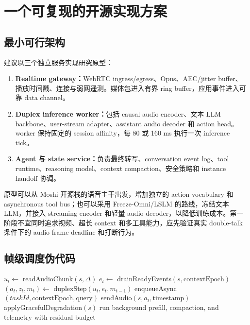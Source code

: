\documentclass[UTF8,fontset=none,a4paper,10pt]{ctexart}
\begin{document}
\section{一个可复现的开源实现方案}

\subsection{最小可行架构}

建议以三个独立服务实现研究原型：

\begin{enumerate}
  \item \textbf{Realtime gateway：}WebRTC ingress/egress、Opus、AEC/jitter buffer、播放时间戳、连接与弱网遥测。媒体包进入有界 ring buffer，应用事件进入可靠 data channel。
  \item \textbf{Duplex inference worker：}包括 causal audio encoder、文本 LLM backbone、user-stream adapter、assistant audio decoder 和 action head。worker 保持固定的 session affinity，每 80 或 160 ms 执行一次 inference tick。
  \item \textbf{Agent 与 state service：}负责最终转写、conversation event log、tool runtime、reasoning model、context compaction、安全策略和 instance handoff 协调。
\end{enumerate}

原型可以从 Moshi 开源栈的语音主干出发\cite{zh:defossez2024moshi}，增加独立的 action vocabulary 和 asynchronous tool bus；也可以采用 Freeze-Omni/LSLM 的路线，冻结文本 LLM，并接入 streaming encoder 和轻量 audio decoder，以降低训练成本\cite{zh:wang2024freezeomni,zh:ma2025lslm}。第一阶段不宜同时追求视频、超长 context 和多工具能力，应先验证真实 double-talk 条件下的 audio frame deadline 和打断行为。

\subsection{帧级调度伪代码}

\begin{algorithm}[H]
\caption{Deadline-aware duplex session loop}
\begin{algorithmic}[1]
  \State $u_t\gets$ readAudioChunk$(s,\Delta)$
  \State $e_t\gets$ drainReadyEvents$(s,\mathrm{contextEpoch})$
  \State $(a_t,z_t,m_t)\gets$ duplexStep$(u_t,e_t,m_{t-1})$
    \State enqueueAsync$(taskId,\mathrm{contextEpoch},\mathrm{query})$
  \EndIf
    \State sendAudio$(s,a_t,\mathrm{timestamp})$
  \Else
    \State applyGracefulDegradation$(s)$
  \EndIf
\EndFor
\State run background prefill, compaction, and telemetry with residual budget
\end{algorithmic}
\end{algorithm}
\end{document}
